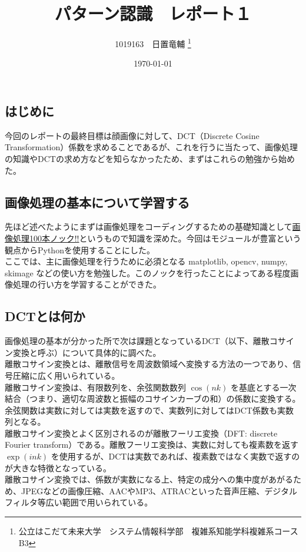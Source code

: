 \documentclass[dvipdfmx,uplatex]{jsarticle}
\title{パターン認識　レポート１}
\author{1019163　日置竜輔 \thanks{公立はこだて未来大学　システム情報科学部　複雑系知能学科複雑系コース　B3}}
\date{\today}
\begin{document}
\begin{spacing}{1.4}

\maketitle
\tableofcontents %

\newpage

\section{はじめに}
今回のレポートの最終目標は顔画像に対して、DCT（Discrete Cosine Transformation）係数を求めることであるが、これを行うに当たって、画像処理の知識やDCTの求め方などを知らなかったため、まずはこれらの勉強から始めた。 \\

\subsection{画像処理の基本について学習する}
先ほど述べたようにまずは画像処理をコーディングするための基礎知識として\href{https://github.com/yoyoyo-yo/Gasyori100knock}{画像処理100本ノック!!}というもので知識を深めた。今回はモジュールが豊富という観点からPythonを使用することにした。 \\
ここでは、主に画像処理を行うために必須となる matplotlib, opencv, numpy, skimage などの使い方を勉強した。このノックを行ったことによってある程度画像処理の行い方を学習することができた。

\subsection{DCTとは何か}
画像処理の基本が分かった所で次は課題となっているDCT（以下、離散コサイン変換と呼ぶ）について具体的に調べた。 \\
離散コサイン変換とは、離散信号を周波数領域へ変換する方法の一つであり、信号圧縮に広く用いられている。 \\
離散コサイン変換は、有限数列を、余弦関数数列 $\cos(nk)$ を基底とする一次結合（つまり、適切な周波数と振幅のコサインカーブの和）の係数に変換する。余弦関数は実数に対しては実数を返すので、実数列に対してはDCT係数も実数列となる。\\
離散コサイン変換とよく区別されるのが離散フーリエ変換（DFT: discrete Fourier transform）である。離散フーリエ変換は、実数に対しても複素数を返す$\exp(ink)$ を使用するが、DCTは実数であれば、複素数ではなく実数で返すのが大きな特徴となっている。 \\
離散コサイン変換では、係数が実数になる上、特定の成分への集中度があがるため、JPEGなどの画像圧縮、AACやMP3、ATRACといった音声圧縮、デジタルフィルタ等広い範囲で用いられている。


\end{spacing}
\end{document}
